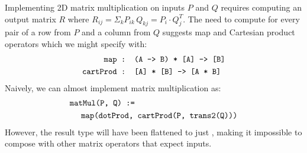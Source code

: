 



\noindent
Implementing 2D matrix multiplication
  on inputs $P$ and $Q$ requires computing
  an output matrix $R$ where
  $R_{ij} = \Sigma_k P_{ik} \, Q_{kj}
          =  P_i \cdot Q^{T}_{j}$. %
The need to compute  for every pair
  of a row from $P$ and a column from $Q$
  suggests map and Cartesian product operators
  which we might specify with:
\begin{align*}
    \mathrm{\texttt{map}} &
    \mathrm{\texttt{ : (A -> B) * [A] -> [B]}} \\
    \mathrm{\texttt{cartProd}} &
    \mathrm{\texttt{ : [A] * [B] -> [A * B]}}
\end{align*}
Naively, we can almost implement matrix multiplication as:
{\color{red} \begin{align*}
  & \mathrm{\texttt{matMul(P, Q) :=}} \\
  & \;\;\;\;\; \mathrm{\texttt{map(dotProd, cartProd(P, trans2(Q)))}}
\end{align*} }
However, the result type will have been
  flattened to just {\color{red}\tcd{[f64]}},
  making it impossible to compose with other matrix
  operators that expect \tcd{[[f64]]} inputs.

